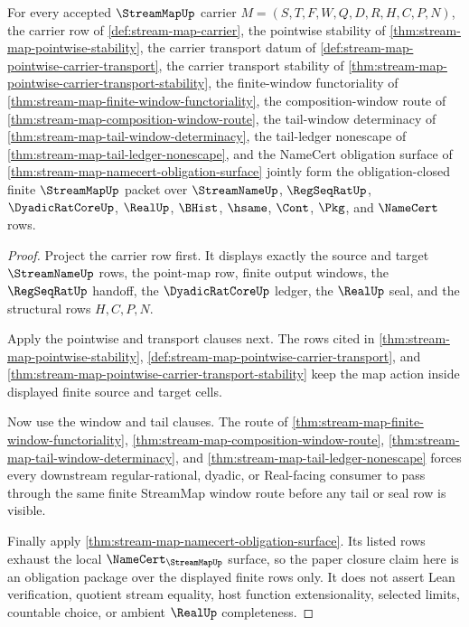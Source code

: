 \begin{theorem}
\label{thm:stream-map-obligation-closure-package}
For every accepted $\StreamMapUp$ carrier $M=(S,T,F,W,Q,D,R,H,C,P,N)$, the carrier row of \autoref{def:stream-map-carrier}, the pointwise stability of \autoref{thm:stream-map-pointwise-stability}, the carrier transport datum of \autoref{def:stream-map-pointwise-carrier-transport}, the carrier transport stability of \autoref{thm:stream-map-pointwise-carrier-transport-stability}, the finite-window functoriality of \autoref{thm:stream-map-finite-window-functoriality}, the composition-window route of \autoref{thm:stream-map-composition-window-route}, the tail-window determinacy of \autoref{thm:stream-map-tail-window-determinacy}, the tail-ledger nonescape of \autoref{thm:stream-map-tail-ledger-nonescape}, and the NameCert obligation surface of \autoref{thm:stream-map-namecert-obligation-surface} jointly form the obligation-closed finite $\StreamMapUp$ packet over $\StreamNameUp$, $\RegSeqRatUp$, $\DyadicRatCoreUp$, $\RealUp$, $\BHist$, $\hsame$, $\Cont$, $\Pkg$, and $\NameCert$ rows.
\end{theorem}
\begin{proof}
Project the carrier row first. It displays exactly the source and target $\StreamNameUp$ rows, the point-map row, finite output windows, the $\RegSeqRatUp$ handoff, the $\DyadicRatCoreUp$ ledger, the $\RealUp$ seal, and the structural rows $H,C,P,N$.

Apply the pointwise and transport clauses next. The rows cited in \autoref{thm:stream-map-pointwise-stability}, \autoref{def:stream-map-pointwise-carrier-transport}, and \autoref{thm:stream-map-pointwise-carrier-transport-stability} keep the map action inside displayed finite source and target cells.

Now use the window and tail clauses. The route of \autoref{thm:stream-map-finite-window-functoriality}, \autoref{thm:stream-map-composition-window-route}, \autoref{thm:stream-map-tail-window-determinacy}, and \autoref{thm:stream-map-tail-ledger-nonescape} forces every downstream regular-rational, dyadic, or Real-facing consumer to pass through the same finite StreamMap window route before any tail or seal row is visible.

Finally apply \autoref{thm:stream-map-namecert-obligation-surface}. Its listed rows exhaust the local $\NameCert_{\StreamMapUp}$ surface, so the paper closure claim here is an obligation package over the displayed finite rows only. It does not assert Lean verification, quotient stream equality, host function extensionality, selected limits, countable choice, or ambient $\RealUp$ completeness.
\end{proof}

